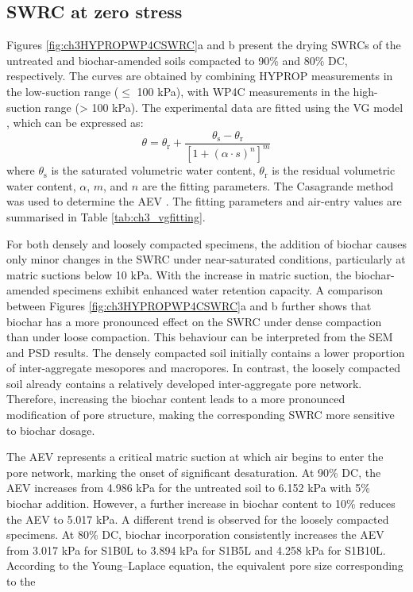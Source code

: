 \subsection{\Ac{SWRC} at zero stress}
Figures \ref{fig:ch3HYPROPWP4CSWRC}a and b present the drying \ac{SWRC}s of the untreated and biochar-amended soils compacted to 90\% and 80\% \ac{DC}, respectively. The curves are obtained by combining HYPROP measurements in the low-suction range ($\leq$ 100 kPa), with WP4C measurements in the high-suction range (> 100 kPa). The experimental data are fitted using the \ac{VG} model \parencite{vangenuchtenClosedformEquationPredicting1980}, which can be expressed as:
\begin{equation}
    \theta = \theta_{\mathrm{r}}+\frac{\theta_{\mathrm{s}} - \theta_{\mathrm{r}}}{[1+(\alpha \cdot s)^{n}]^{m}}
\end{equation}
where $\theta _{\mathrm{s}}$ is the saturated volumetric water content, $\theta _{\mathrm{r}}$ is the residual volumetric water content, $\alpha$, $m$, and $n$ are the fitting parameters. The Casagrande method was used to determine the \ac{AEV} \parencite{vanapalliInfluenceSoilStructure1999}. The fitting parameters and air-entry values are summarised in Table \ref{tab:ch3_vgfitting}.\par
For both densely and loosely compacted specimens, the addition of biochar causes only minor changes in the \ac{SWRC} under near-saturated conditions, particularly at matric suctions below 10 kPa. With the increase in matric suction, the biochar-amended specimens exhibit enhanced water retention capacity. A comparison between Figures \ref{fig:ch3HYPROPWP4CSWRC}a and b further shows that biochar has a more pronounced effect on the \ac{SWRC} under dense compaction than under loose compaction. This behaviour can be interpreted from the \ac{SEM} and \ac{PSD} results. The densely compacted soil initially contains a lower proportion of inter-aggregate mesopores and macropores. In contrast, the loosely compacted soil already contains a relatively developed inter-aggregate pore network. Therefore, increasing the biochar content leads to a more pronounced modification of pore structure, making the corresponding \ac{SWRC} more sensitive to biochar dosage.\par
The \ac{AEV} represents a critical matric suction at which air begins to enter the pore network, marking the onset of significant desaturation. At 90\% \ac{DC}, the \ac{AEV} increases from 4.986 kPa for the untreated soil to 6.152 kPa with 5\% biochar addition. However, a further increase in biochar content to 10\% reduces the \ac{AEV} to 5.017 kPa. A different trend is observed for the loosely compacted specimens. At 80\% \ac{DC}, biochar incorporation consistently increases the \ac{AEV} from 3.017 kPa for S1B0L to 3.894 kPa for S1B5L and 4.258 kPa for S1B10L. According to the Young–Laplace equation, the equivalent pore size corresponding to the 
